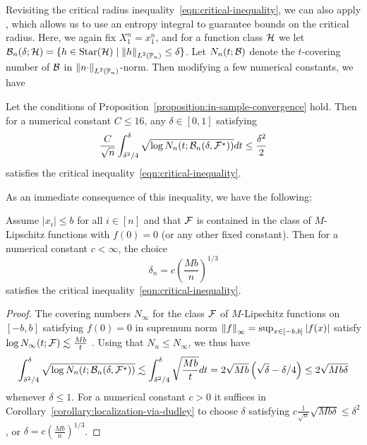Revisiting the critical radius inequality~\eqref{eqn:critical-inequality},
we can also apply \cite[Corollary~13.7]{Wainwright19}, which allows
us to use an entropy integral to guarantee bounds on the critical
radius. Here, we again fix $X_1^n = x_1^n$, and for a function
class $\mathcal{H}$ we let
$\mathcal{B}_n(\delta; \mathcal{H}) = \{h \in \textup{Star}(\mathcal{H})
\mid \left\|{h}\right\|_{L^2(\mathbb{P}_n)} \le \delta\}$. Let $N_n(t; \mathcal{B})$ denote the
$t$-covering number of $\mathcal{B}$ in $\left\|{n\cdot}\right\|_{L^2(\mathbb{P}_n)}$-norm. Then
modifying a few numerical constants, we have
\begin{corollary}
  \label{corollary:localization-via-dudley}
  Let the conditions of
  Proposition~\ref{proposition:in-sample-convergence} hold. Then
  for a numerical constant $C \le 16$,
  any $\delta \in [0, 1]$ satisfying
  \begin{equation*}
    \frac{C}{\sqrt{n}} \int_{\delta^2 / 4}^\delta
    \sqrt{\log N_n(t; \mathcal{B}_n(\delta, \mathcal{F}^\star))} dt
    \le \frac{\delta^2}{2}
  \end{equation*}
  satisfies the critical inequality~\eqref{eqn:critical-inequality}.
\end{corollary}
\noindent
As an immediate consequence of this inequality, we have the following:
\begin{corollary}
  \label{corollary:lipschitz-criticality}
  Assume $|x_i| \le b$ for all $i \in [n]$ and that
  $\mathcal{F}$ is contained in the class of $M$-Lipschitz functions
  with $f(0) = 0$ (or any other fixed constant).
  Then for a numerical
  constant $c < \infty$, the choice
  \begin{equation*}
    \delta_n = c \left(\frac{M b}{n}\right)^{1/3}
  \end{equation*}
  satisfies the critical inequality~\eqref{eqn:critical-inequality}.
\end{corollary}
\begin{proof}
  The covering numbers $N_\infty$
  for the class $\mathcal{F}$ of $M$-Lipschitz functions
  on $[-b, b]$
  satisfying $f(0) = 0$
  in supremum norm $\left\|{f}\right\|_\infty = \sup_{x \in [-b, b]} |f(x)|$ satisfy
  $\log N_\infty(t; \mathcal{F}) \lesssim \frac{M b}{t}$
  \cite[cf.][Example 5.10]{Wainwright19}. Using that $N_n \le N_\infty$,
  we thus have
  \begin{equation*}
    \int_{\delta^2/4}^\delta
    \sqrt{\log N_n(t; \mathcal{B}_n(\delta, \mathcal{F}^\star))}
    \lesssim
    \int_{\delta^2/4}^\delta
    \sqrt{\frac{Mb}{t}} dt
    = 2 \sqrt{Mb} \left(\sqrt{\delta} - \delta/4\right)
    \le 2 \sqrt{Mb \delta}
  \end{equation*}
  whenever $\delta \le 1$.
  For a numerical constant $c > 0$ it suffices in
  Corollary~\ref{corollary:localization-via-dudley} to choose
  $\delta$ satisfying
  $c \frac{1}{\sqrt{n}} \sqrt{Mb \delta} \le \delta^2$, or
  $\delta = c (\frac{Mb}{n})^{1/3}$.
\end{proof}


